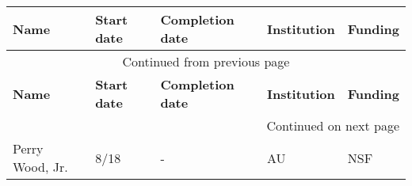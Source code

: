 {\sffamily\small
\begin{longtable}[l]{ @{} p{1.2in} p{0.5in} p{0.8in}p{0.75in} p{2in} @{} }
    \hline
    \textbf{Name} & \textbf{Start date} & \textbf{Completion date} & \textbf{Institution} & \textbf{Funding} \\
    \hline
    \endfirsthead
    \multicolumn{5}{c}{{Continued from previous page}} \\
    \hline
    \textbf{Name} & \textbf{Start date} & \textbf{Completion date} & \textbf{Institution} & \textbf{Funding} \\
    \hline
    \endhead
    \hline \multicolumn{5}{r}{{Continued on next page}} \\
    \endfoot
    \hline
    \endlastfoot
    Perry Wood, Jr. & 8/18 & - & AU & NSF \\
\end{longtable}
}
